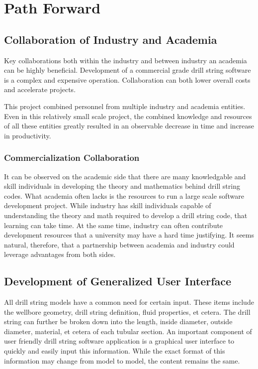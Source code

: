 \section{Path Forward}
\subsection{Collaboration of Industry and Academia}
Key collaborations both within the industry and between industry an academia can be highly beneficial.  Development of a commercial grade drill string software is a complex and expensive operation.  Collaboration can both lower overall costs and accelerate projects.

This project combined personnel from multiple industry and academia entities.  Even in this relatively small scale project, the combined knowledge and resources of all these entities greatly resulted in an observable decrease in time and increase in productivity.

\subsubsection{Commercialization Collaboration}
It can be observed on the academic side that there are many knowledgable and skill individuals in developing the theory and mathematics behind drill string codes.  What academia often lacks is the resources to run a large scale software development project.  While industry has skill individuals capable of understanding the theory and math required to develop a drill string code, that learning can take time.  At the same time, industry can often contribute development resources that a university may have a hard time justifying.  It seems natural, therefore, that a partnership between academia and industry could leverage advantages from both sides.

\subsection{Development of Generalized User Interface}
All drill string models have a common need for certain input.  These items include the wellbore geometry, drill string definition, fluid properties, et cetera.  The drill string can further be broken down into the length, inside diameter, outside diameter, material, et cetera of each tubular section.  An important component of user friendly drill string software application is a graphical user interface to quickly and easily input this information.  While the exact format of this information may change from model to model, the content remains the same.

